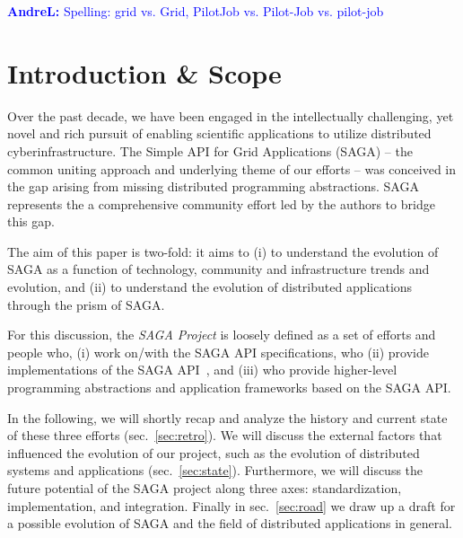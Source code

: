 \documentclass[]{article}
\newcommand{\I}[1]{\textit{#1}}
\newcommand{\B}[1]{\textbf{#1}}
\newcommand{\alnote}[1]{{\textcolor{blue}{    \B{AndreL:  } #1 }}}
\newcommand{\alnote}[1]{}
\begin{document}
\alnote{Spelling: grid vs. Grid, PilotJob vs. Pilot-Job vs. pilot-job}

\section{Introduction \& Scope }
\label{sec:intro}

Over the past decade, we have been engaged in the intellectually
challenging, yet novel and rich pursuit of enabling scientific
applications to utilize distributed cyberinfrastructure. The Simple
API for Grid Applications (SAGA) -- the common uniting approach and
underlying theme of our efforts -- was conceived in the gap arising
from missing distributed programming abstractions. SAGA represents the
a comprehensive community effort led by the authors to bridge this
gap.

The aim of this paper is two-fold: it aims to (i) to understand the
evolution of SAGA as a function of technology, community and
infrastructure trends and evolution, and (ii) to understand the
evolution of distributed applications through the prism of SAGA.

For this discussion, the \I{SAGA Project} is loosely defined as a set
of efforts and people who, (i) work on/with the SAGA API
specifications\cite{saga-core}, who (ii) provide implementations of
the SAGA API~\cite{saga-c++,jsaga,javasaga}, and (iii) who provide
higher-level programming abstractions and application frameworks based
on the SAGA API\cite{bigjob_cloudcom10}.

In the following, we will shortly recap and analyze the history and
current state of these three efforts (sec.~\ref{sec:retro}). We will
discuss the external factors that influenced the evolution of our
project, such as the evolution of distributed systems and applications
(sec.~\ref{sec:state}). Furthermore, we will discuss the future
potential of the SAGA project along three axes: standardization,
implementation, and integration. Finally in sec.~\ref{sec:road} we
draw up a draft for a possible evolution of SAGA and the field of
distributed applications in general.

 
\end{document}
